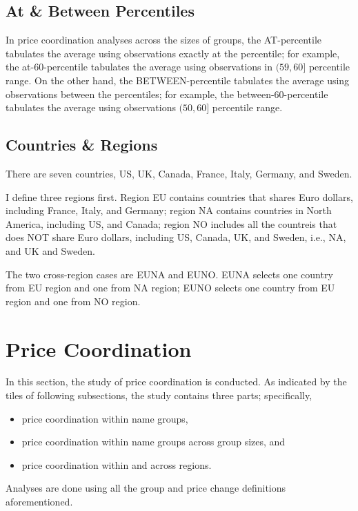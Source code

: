\subsection{At \& Between Percentiles}

In price coordination analyses across the sizes of groups, the AT-percentile tabulates the average using observations exactly at the percentile; for example, the at-60-percentile tabulates the average using observations in $ (59,60] $ percentile range. On the other hand, the BETWEEN-percentile tabulates the average using observations between the percentiles; for example, the between-60-percentile tabulates the average using observations $ (50,60] $ percentile range.

\subsection{Countries \& Regions}

There are seven countries, US, UK, Canada, France, Italy, Germany, and Sweden.

I define three regions first. Region EU contains countries that shares Euro dollars, including France, Italy, and Germany; region NA contains countries in North America, including US, and Canada; region NO includes all the countreis that does NOT share Euro dollars, including US, Canada, UK, and Sweden, i.e., NA, and UK and Sweden.

The two cross-region cases are EUNA and EUNO. EUNA selects one country from EU region and one from NA region; EUNO selects one country from EU region and one from NO region.

\clearpage
\section{Price Coordination}

In this section, the study of price coordination is conducted. As indicated by the tiles of following subsections, the study contains three parts; specifically,
\begin{itemize}
	\item price coordination within name groups,
	\item price coordination within name groups across group sizes, and
	\item price coordination within and across regions.
\end{itemize}
Analyses are done using all the group and price change definitions aforementioned.

